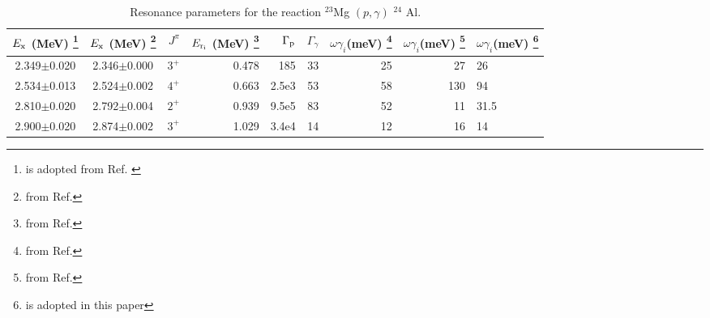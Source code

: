 \documentclass[manuscript]{aastex}
\begin{document}
\begin{table*}[htb]\footnotesize
\centering
\begin{minipage}{140mm}
\caption{Resonance parameters for the reaction $^{23}$Mg
$(p,\gamma)$ $^{24}$ Al.} \label{t.lbl}

\begin{tabular}{ccrrrrrrl}
\hline

 $E_{\rm{x}}$ (MeV)  \footnote{is adopted from Ref. \citep{Endt98}} &$E_{\rm{x}}$ (MeV) \footnote{from Ref.\citep{Visser07}}
 &$J^{\pi}$ & $E_{\rm{{r_{i}}}}$ (MeV) \footnote{ from Ref.\citep{Audi95}} & $\Gamma_{\rm{p}}$ &
 $\Gamma_{\gamma}$ & $\omega \gamma_{i}$(meV) \footnote{ from Ref.\citep{Herndl98}}
 &$\omega \gamma_{i}$(meV) \footnote{from Ref.\citep{Wiescher86}} & $\omega \gamma_{i}$(meV) \footnote{is adopted in this paper}\\
 \hline
2.349$\pm$0.020 &2.346$\pm$0.000 &$3^{+}$  &0.478   &185   &33  &25  &27  &26\\
2.534$\pm$0.013  &2.524$\pm$0.002 &$4^{+}$  &0.663   &2.5e3 &53  &58  &130 &94\\
2.810$\pm$0.020  &2.792$\pm$0.004 &$2^{+}$  &0.939   &9.5e5 &83  &52  &11  &31.5\\
2.900$\pm$0.020  &2.874$\pm$0.002 &$3^{+}$  &1.029   &3.4e4 &14  &12  &16  &14\\


\hline
\end{tabular}

\end{minipage}
\end{table*}
\end{document}
